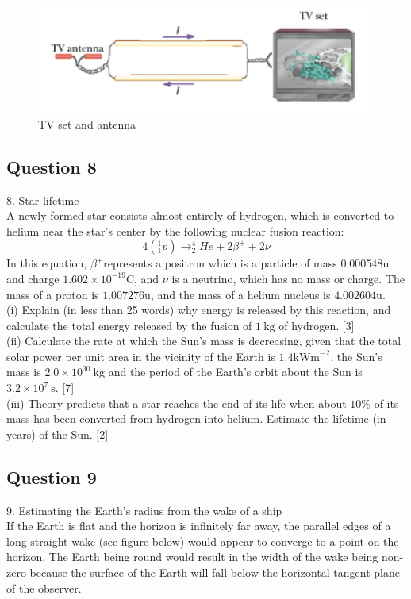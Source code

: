 \documentclass{article}
\begin{document}
\begin{figure}
	\centering
	\includegraphics[width=0.5\linewidth]{spho_book_TYS_images/2015q7.png}
	\caption{TV set and antenna}
\end{figure}

\subsection{Question 8}
8. Star lifetime \\
A newly formed star consists almost entirely of hydrogen, which is converted to helium near the star's center by the following nuclear fusion reaction:
$$
4\left({ }_{1}^{1} p\right) \rightarrow_{2}^{4} H e+2 \beta^{+}+2 \nu
$$
In this equation, $\beta^{+}$represents a positron which is a particle of mass $0.000548 \mathrm{u}$ and charge $1.602 \times 10^{-19} \mathrm{C}$, and $\nu$ is a neutrino, which has no mass or charge. The mass of a proton is $1.007276 \mathrm{u}$, and the mass of a helium nucleus is $4.002604 \mathrm{u}$. \\
(i) Explain (in less than 25 words) why energy is released by this reaction, and calculate the total energy released by the fusion of $1 \mathrm{~kg}$ of hydrogen. [3] \\
(ii) Calculate the rate at which the Sun's mass is decreasing, given that the total solar power per unit area in the vicinity of the Earth is $1.4 \mathrm{kWm}^{-2}$, the Sun's mass is $2.0 \times 10^{30} \mathrm{~kg}$ and the period of the Earth's orbit about the Sun is $3.2 \times 10^{7} \mathrm{~s}$. [7] \\
(iii) Theory predicts that a star reaches the end of its life when about $10 \%$ of its mass has been converted from hydrogen into helium. Estimate the lifetime (in years) of the Sun. [2]

\subsection{Question 9}
9. Estimating the Earth's radius from the wake of a ship \\
If the Earth is flat and the horizon is infinitely far away, the parallel edges of a long straight wake (see figure below) would appear to converge to a point on the horizon. The Earth being round would result in the width of the wake being non-zero because the surface of the Earth will fall below the horizontal tangent plane of the observer.
\end{document}
